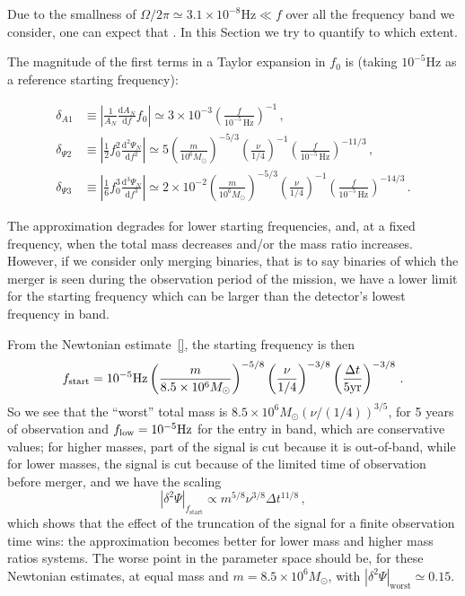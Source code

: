 \documentclass[aps,showpacs,twocolumn,
prd,superscriptaddress,nofootinbib]{revtex4-1}
\newcommand{\be}{\begin{equation}}
\newcommand{\ee}{\end{equation}}
\newcommand\ud{{\mathrm{d}}}
\newcommand{\Hz}{\,\mathrm{Hz}}
\newcommand{\Msol}{M_{\odot}}
\begin{document}
Due to the smallness of $\Omega/2\pi \simeq 3.1\times10^{-8}\mathrm{Hz} \ll f$ over all the frequency band we consider, one can expect that . In this Section we try to quantify to which extent. 

The magnitude of the first terms in a Taylor expansion in $f_{0}$ is (taking $10^{-5}\mathrm{Hz}$ as a reference starting frequency):
%
\begin{widetext}
\begin{subequations}
\begin{align}
	\delta_{A1} &\equiv \left| \frac{1}{A_{N}}\frac{\ud A_{N}}{\ud f} f_0 \right| \simeq 3\times10^{-3} \left(\frac{f}{10^{-5}\Hz}\right)^{-1} \,,\\
	\delta_{\Psi 2} &\equiv \left| \frac{1}{2} f_0^{2}\frac{\ud^{2} \Psi_{N}}{\ud f^{2}} \right| \simeq 5 \left( \frac{m}{10^{6}\Msol} \right)^{-5/3} \left( \frac{\nu}{1/4} \right)^{-1} \left( \frac{f}{10^{-5}\Hz} \right)^{-11/3} \,, \\
	\delta_{\Psi 3} &\equiv \left| \frac{1}{6} f_0^{3}\frac{\ud^{3} \Psi_{N}}{\ud f^{3}} \right| \simeq 2\times 10^{-2} \left( \frac{m}{10^{6}\Msol} \right)^{-5/3} \left( \frac{\nu}{1/4} \right)^{-1} \left( \frac{f}{10^{-5}\Hz} \right)^{-14/3} \,.
\end{align}
\end{subequations}
\end{widetext}
%
The approximation degrades for lower starting frequencies, and, at a fixed frequency, when the total mass decreases and/or the mass ratio increases. However, if we consider only merging binaries, that is to say binaries of which the merger is seen during the observation period of the mission, we have a lower limit for the starting frequency which can be larger than the detector's lowest frequency in band.

From the Newtonian estimate~\eqref{}, the starting frequency is then
%
\be
	f_{\rm start} = 10^{-5}\mathrm{Hz} \left( \frac{m}{8.5\times10^{6}\Msol} \right)^{-5/8} \left( \frac{\nu}{1/4} \right)^{-3/8} \left( \frac{\Delta t}{5 \mathrm{yr}} \right)^{-3/8} \,.
\ee
%
So we see that the ``worst'' total mass is $8.5\times10^6\Msol (\nu/(1/4))^{3/5}$, for 5 years of observation and $f_{\rm low} = 10^{-5}\mathrm{Hz}$ for the entry in band, which are conservative values; for higher masses, part of the signal is cut because it is out-of-band, while for lower masses, the signal is cut because of the limited time of observation before merger, and we have the scaling
%
\be
	|\delta^{2}\Psi |_{f_\mathrm{start}} \propto m^{5/8}\nu^{3/8}\Delta t^{11/8} \,,
\ee
%
which shows that the effect of the truncation of the signal for a finite observation time wins: the approximation becomes better for lower mass and higher mass ratios systems. The worse point in the parameter space should be, for these Newtonian estimates, at equal mass and $m=8.5\times 10^{6} \Msol$, with $|\delta^{2}\Psi |_{\mathrm{worst}} \simeq 0.15$.
\end{document}
